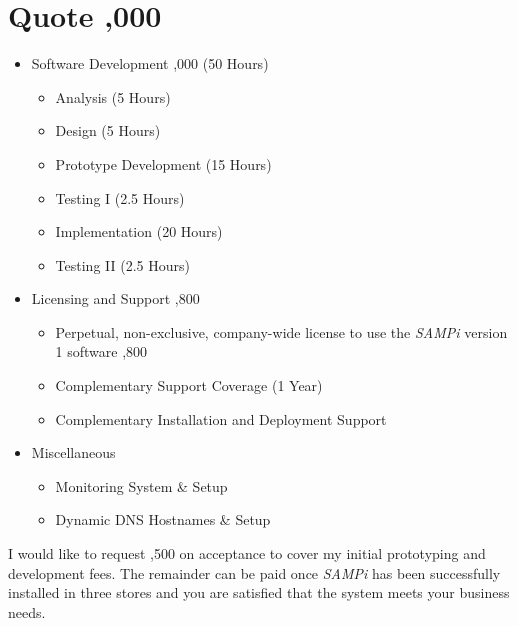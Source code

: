 \documentclass[a4paper,12pt]{article}
\begin{document}
\section*{Quote \textrightarrow {},000}
\begin{itemize}
    \item{Software Development \textrightarrow {},000 (50 Hours)}
        \begin{itemize}
            \item {Analysis \textrightarrow {} (5 Hours)}
            \item {Design \textrightarrow {} (5 Hours)}
            \item {Prototype Development \textrightarrow {} (15 Hours)}
            \item {Testing I \textrightarrow {} (2.5 Hours)}
            \item {Implementation \textrightarrow {} (20 Hours)}
            \item {Testing II \textrightarrow {} (2.5 Hours)}
        \end{itemize}
    \item{Licensing and Support \textrightarrow {},800}
        \begin{itemize}
            \item {Perpetual, non-exclusive, company-wide license to use the \textit{SAMPi} version 1 software \textrightarrow {},800 }
            \item {Complementary Support Coverage (1 Year) \textrightarrow {}}
            \item{Complementary Installation and Deployment Support \textrightarrow {}}
        \end{itemize}
    \item{Miscellaneous \textrightarrow {}}
        \begin{itemize}
            \item{Monitoring System \& Setup \textrightarrow {}}
            \item{Dynamic DNS Hostnames \& Setup \textrightarrow {}}
    \end{itemize}
\end{itemize}

I would like to request ,500 on acceptance to cover my initial prototyping and development fees. The remainder can be paid once \textit{SAMPi} has been successfully installed in three stores and you are satisfied that the system meets your business needs. 
\end{document}
